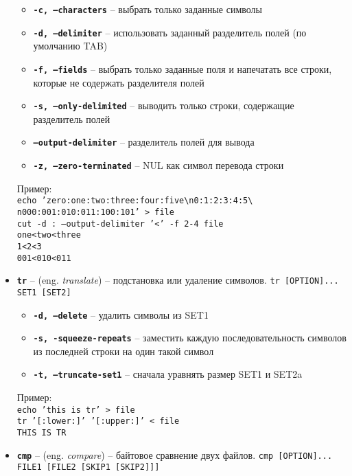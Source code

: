 \documentclass[12pt, a4paper]{article}
\begin{document}
\begin{itemize}
\begin{itemize}
    \item \textbf{\texttt{-c, --characters}} -- выбрать только заданные
      символы
    \item \textbf{\texttt{-d, --delimiter}} -- использовать заданный разделитель
      полей (по умолчанию TAB)
    \item \textbf{\texttt{-f, --fields}} -- выбрать только заданные поля и
      напечатать все строки, которые не содержать разделителя полей
    \item \textbf{\texttt{-s, --only-delimited}} -- выводить только строки,
      содержащие разделитель полей
    \item \textbf{\texttt{--output-delimiter}} -- разделитель полей для вывода
    \item \textbf{\texttt{-z, --zero-terminated}} -- NUL как символ перевода
      строки
  \end{itemize}
  Пример:\\
  \texttt{echo 'zero:one:two:three:four:five\backslash n0:1:2:3:4:5\backslash
    n000:001:010:011:100:101' > file}\\
  \texttt{cut -d : --output-delimiter '<' -f 2-4 file}\\
  \texttt{one<two<three}\\
  \texttt{1<2<3}\\
  \texttt{001<010<011}\\
  \item \textbf{\texttt{tr}} -- (eng. \textit{translate}) -- подстановка или
    удаление символов. \texttt{tr [OPTION]... SET1 [SET2]}
  \begin{itemize}
    \item \textbf{\texttt{-d, --delete}} -- удалить символы из SET1
    \item \textbf{\texttt{-s, -squeeze-repeats}} -- заместить каждую
      последовательность символов из последней строки на один такой символ
    \item \textbf{\texttt{-t, --truncate-set1}} -- сначала уравнять размер SET1
      и SET2a
  \end{itemize}
  Пример:\\
  \texttt{echo 'this is tr' > file}\\
  \texttt{tr '[:lower:]' '[:upper:]' < file}\\
  \texttt{THIS IS TR}\\
  \item \textbf{\texttt{cmp}} -- (eng. \textit{compare}) -- байтовое сравнение
    двух файлов. \texttt{cmp [OPTION]... FILE1 [FILE2 [SKIP1 [SKIP2]]]}

\end{itemize}
\end{document}
